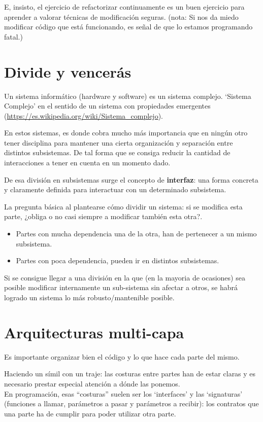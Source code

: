 \documentclass[spanish,12pt,a4paper,final,oneside]{book}
\begin{document}
E, insisto, el ejercicio de refactorizar continuamente es un buen ejercicio para aprender a valorar técnicas de modificación seguras. (nota: Si nos da miedo modificar código que está funcionando, es señal de que lo estamos programando fatal.)


\section{Divide y vencerás}
Un sistema informático (hardware y software) es un sistema complejo. `Sistema Complejo' en el sentido de un sistema con propiedades emergentes (\url{https://es.wikipedia.org/wiki/Sistema_complejo}).

En estos sistemas, es donde cobra mucho más importancia que en ningún otro tener disciplina para mantener una cierta organización y separación entre distintos subsistemas. De tal forma que se consiga reducir la cantidad de interacciones a tener en cuenta en un momento dado.

De esa división en subsistemas surge el concepto de \textbf{interfaz}: una forma concreta y claramente definida para interactuar con un determinado subsistema.

La pregunta básica al plantearse cómo dividir un sistema: si se modifica esta parte, ¿obliga o no casi siempre a modificar también esta otra?.
\begin{itemize}
\item Partes con mucha dependencia una de la otra, han de pertenecer a un mismo subsistema. 
\item Partes con poca dependencia, pueden ir en distintos subsistemas.
\end{itemize}

Si se consigue llegar a una división en la que (en la mayoria de ocasiones) sea posible modificar internamente un sub-sistema sin afectar a otros, se habrá logrado un sistema lo más robusto/mantenible posible.

\section{Arquitecturas multi-capa}

Es importante organizar bien el código y lo que hace cada parte del mismo.

Haciendo un símil con un traje: las costuras entre partes han de estar claras y es necesario prestar especial atención a dónde las ponemos.
\\En programación, esas ``costuras'' suelen ser los `interfaces' y las `signaturas' (funciones a llamar, parámetros a pasar y parámetros a recibir): los contratos  que una parte ha de cumplir para poder utilizar otra parte.
\end{document}
